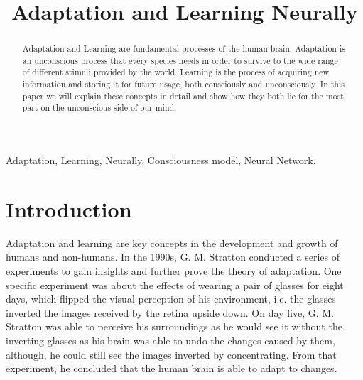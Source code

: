 \documentclass[conference]{IEEEtran}
\begin{document}


\title{Adaptation and Learning Neurally}

\author{
\and
{}
}

\maketitle

\begin{abstract}
	Adaptation and Learning are fundamental processes of the human brain. Adaptation is an unconscious process that every species needs in order to survive to the wide range of different stimuli provided by the world. Learning is the process of acquiring new information and storing it for future usage, both consciously and unconsciously. In this paper we will explain these concepts in detail and show how they both lie for the most part on the unconscious side of our mind.
\end{abstract}

\begin{IEEEkeywords}
	Adaptation, Learning, Neurally, Consciousness model, Neural Network.
\end{IEEEkeywords}

\section{Introduction}

	Adaptation and learning are key concepts in the development and growth of humans and non-humans. In the 1990s, G. M. Stratton conducted a series of experiments to gain insights and further prove the theory of adaptation. One specific experiment was about the effects of wearing a pair of glasses for eight days, which flipped the visual perception of his environment, i.e. the glasses inverted the images received by the retina upside down. On day five, G. M. Stratton was able to perceive his surroundings as he would see it without the inverting glasses as his brain was able to undo the changes caused by them, although, he could still see the images inverted by concentrating. From that experiment, he concluded that the human brain is able to adapt to changes. \cite{a1}
\end{document}
